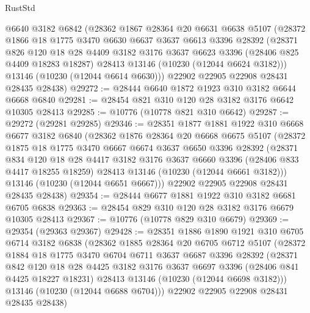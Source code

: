 \begin{lexlean}{RustStd}
\begin{coremodule}
    @6640
    @3182
    @6842
    (@28362
      @1867
      @28364
      @20
      @6631
      @6638
      @5107
      (@28372
        @1866
        @18
        @1775
        @3470
        @6630
        @6637
        @3637
        @6613
        @3396
        @28392
        (@28371
          @826
          @120
          @18
          @28
          @4409
          @3182
          @3176
          @3637
          @6623
          @3396
          (@28406 @825 @4409 @18283 @18287)
          @28413
          @13146
          (@10230 (@12044 @6624 @3182)))
        @13146
        (@10230 (@12044 @6614 @6630)))
      @22902
      @22905
      @22908
      @28431
      @28435
      @28438)
@29272 := @28444 @6640 @1872 @1923 @310 @3182 @6644 @6668 @6840
@29281 := @28454 @821 @310 @120 @28 @3182 @3176 @6642 @10305 @28413
@29285 := @10776 (@10778 @821 @310 @6642)
@29287 := @29272 (@29281 @29285)
@29346 := @28351
    @1877
    @1881
    @1922
    @310
    @6668
    @6677
    @3182
    @6840
    (@28362
      @1876
      @28364
      @20
      @6668
      @6675
      @5107
      (@28372
        @1875
        @18
        @1775
        @3470
        @6667
        @6674
        @3637
        @6650
        @3396
        @28392
        (@28371
          @834
          @120
          @18
          @28
          @4417
          @3182
          @3176
          @3637
          @6660
          @3396
          (@28406 @833 @4417 @18255 @18259)
          @28413
          @13146
          (@10230 (@12044 @6661 @3182)))
        @13146
        (@10230 (@12044 @6651 @6667)))
      @22902
      @22905
      @22908
      @28431
      @28435
      @28438)
@29354 := @28444 @6677 @1881 @1922 @310 @3182 @6681 @6705 @6838
@29363 := @28454 @829 @310 @120 @28 @3182 @3176 @6679 @10305 @28413
@29367 := @10776 (@10778 @829 @310 @6679)
@29369 := @29354 (@29363 @29367)
@29428 := @28351
    @1886
    @1890
    @1921
    @310
    @6705
    @6714
    @3182
    @6838
    (@28362
      @1885
      @28364
      @20
      @6705
      @6712
      @5107
      (@28372
        @1884
        @18
        @1775
        @3470
        @6704
        @6711
        @3637
        @6687
        @3396
        @28392
        (@28371
          @842
          @120
          @18
          @28
          @4425
          @3182
          @3176
          @3637
          @6697
          @3396
          (@28406 @841 @4425 @18227 @18231)
          @28413
          @13146
          (@10230 (@12044 @6698 @3182)))
        @13146
        (@10230 (@12044 @6688 @6704)))
      @22902
      @22905
      @22908
      @28431
      @28435
      @28438)

\end{coremodule}
\end{lexlean}
